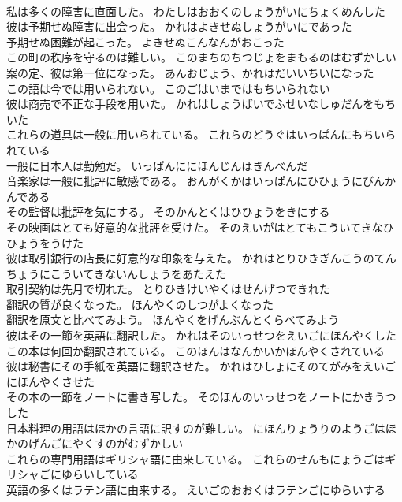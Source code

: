 \documentclass[8pt]{extreport}
\begin{document}
\begin{CJK}{UTF8}{min}
\\	私は多くの障害に直面した。	わたしはおおくのしょうがいにちょくめんした 
\\	彼は予期せぬ障害に出会った。	かれはよきせぬしょうがいにであった 
\\	予期せぬ困難が起こった。	よきせぬこんなんがおこった 
\\	この町の秩序を守るのは難しい。	このまちのちつじょをまもるのはむずかしい 
\\	案の定、彼は第一位になった。	あんおじょう、かれはだいいちいになった 
\\	この語は今では用いられない。	このごはいまではもちいられない 
\\	彼は商売で不正な手段を用いた。	かれはしょうばいでふせいなしゅだんをもちいた 
\\	これらの道具は一般に用いられている。	これらのどうぐはいっぱんにもちいられている 
\\	一般に日本人は勤勉だ。	いっぱんににほんじんはきんべんだ 
\\	音楽家は一般に批評に敏感である。	おんがくかはいっぱんにひひょうにびんかんである 
\\	その監督は批評を気にする。	そのかんとくはひひょうをきにする 
\\	その映画はとても好意的な批評を受けた。	そのえいがはとてもこういてきなひひょうをうけた 
\\	彼は取引銀行の店長に好意的な印象を与えた。	かれはとりひきぎんこうのてんちょうにこういてきないんしょうをあたえた 
\\	取引契約は先月で切れた。	とりひきけいやくはせんげつできれた 
\\	翻訳の質が良くなった。	ほんやくのしつがよくなった 
\\	翻訳を原文と比べてみよう。	ほんやくをげんぶんとくらべてみよう 
\\	彼はその一節を英語に翻訳した。	かれはそのいっせつをえいごにほんやくした 
\\	この本は何回か翻訳されている。	このほんはなんかいかほんやくされている 
\\	彼は秘書にその手紙を英語に翻訳させた。	かれはひしょにそのてがみをえいごにほんやくさせた 
\\	その本の一節をノートに書き写した。	そのほんのいっせつをノートにかきうつした 
\\	日本料理の用語はほかの言語に訳すのが難しい。	にほんりょうりのようごはほかのげんごにやくすのがむずかしい 
\\	これらの専門用語はギリシャ語に由来している。	これらのせんもにょうごはギリシャごにゆらいしている 
\\	英語の多くはラテン語に由来する。	えいごのおおくはラテンごにゆらいする 

\end{CJK}
\end{document}
